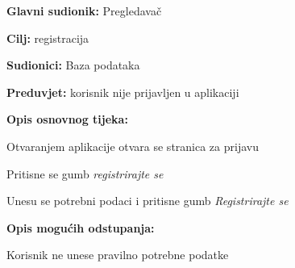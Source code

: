 					\noindent {}
					\begin{packed_item}
						
						\item \textbf{Glavni sudionik: }Pregledavač
						\item  \textbf{Cilj:} registracija
						\item  \textbf{Sudionici:}
						Baza podataka
						\item  \textbf{Preduvjet:} korisnik nije prijavljen u aplikaciji
						\item  \textbf{Opis osnovnog tijeka:}
						
						\item[] \begin{packed_enum}
							
							\item	Otvaranjem aplikacije otvara se stranica za prijavu
							\item	Pritisne se gumb \textit{registrirajte se}
							\item	Unesu se potrebni podaci i pritisne gumb \textit{Registrirajte se}
							
						\end{packed_enum}
						
						\item  \textbf{Opis mogućih odstupanja:}
						
						\item[] \begin{packed_item}
							
							\item[3.a] Korisnik ne unese pravilno potrebne podatke
							
						\end{packed_item}
					\end{packed_item}
					
